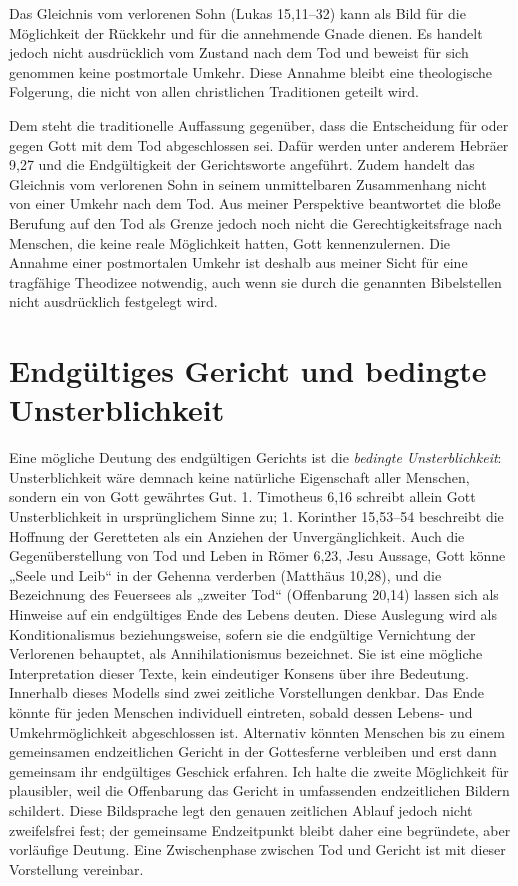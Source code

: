 Das Gleichnis vom verlorenen Sohn (Lukas 15,11--32) kann als Bild für die Möglichkeit der Rückkehr und für die annehmende Gnade dienen. Es handelt jedoch nicht ausdrücklich vom Zustand nach dem Tod und beweist für sich genommen keine postmortale Umkehr. Diese Annahme bleibt eine theologische Folgerung, die nicht von allen christlichen Traditionen geteilt wird.

Dem steht die traditionelle Auffassung gegenüber, dass die Entscheidung für oder gegen Gott mit dem Tod abgeschlossen sei. Dafür werden unter anderem Hebräer 9,27 und die Endgültigkeit der Gerichtsworte angeführt. Zudem handelt das Gleichnis vom verlorenen Sohn in seinem unmittelbaren Zusammenhang nicht von einer Umkehr nach dem Tod. Aus meiner Perspektive beantwortet die bloße Berufung auf den Tod als Grenze jedoch noch nicht die Gerechtigkeitsfrage nach Menschen, die keine reale Möglichkeit hatten, Gott kennenzulernen. Die Annahme einer postmortalen Umkehr ist deshalb aus meiner Sicht für eine tragfähige Theodizee notwendig, auch wenn sie durch die genannten Bibelstellen nicht ausdrücklich festgelegt wird.

\section{Endgültiges Gericht und bedingte Unsterblichkeit}

Eine mögliche Deutung des endgültigen Gerichts ist die \emph{bedingte Unsterblichkeit}: Unsterblichkeit wäre demnach keine natürliche Eigenschaft aller Menschen, sondern ein von Gott gewährtes Gut. 1. Timotheus 6,16 schreibt allein Gott Unsterblichkeit in ursprünglichem Sinne zu; 1. Korinther 15,53--54 beschreibt die Hoffnung der Geretteten als ein Anziehen der Unvergänglichkeit. Auch die Gegenüberstellung von Tod und Leben in Römer 6,23, Jesu Aussage, Gott könne „Seele und Leib“ in der Gehenna verderben (Matthäus 10,28), und die Bezeichnung des Feuersees als „zweiter Tod“ (Offenbarung 20,14) lassen sich als Hinweise auf ein endgültiges Ende des Lebens deuten. Diese Auslegung wird als Konditionalismus beziehungsweise, sofern sie die endgültige Vernichtung der Verlorenen behauptet, als Annihilationismus bezeichnet. Sie ist eine mögliche Interpretation dieser Texte, kein eindeutiger Konsens über ihre Bedeutung.
\\

Innerhalb dieses Modells sind zwei zeitliche Vorstellungen denkbar. Das Ende könnte für jeden Menschen individuell eintreten, sobald dessen Lebens- und Umkehrmöglichkeit abgeschlossen ist. Alternativ könnten Menschen bis zu einem gemeinsamen endzeitlichen Gericht in der Gottesferne verbleiben und erst dann gemeinsam ihr endgültiges Geschick erfahren. Ich halte die zweite Möglichkeit für plausibler, weil die Offenbarung das Gericht in umfassenden endzeitlichen Bildern schildert. Diese Bildsprache legt den genauen zeitlichen Ablauf jedoch nicht zweifelsfrei fest; der gemeinsame Endzeitpunkt bleibt daher eine begründete, aber vorläufige Deutung. Eine Zwischenphase zwischen Tod und Gericht ist mit dieser Vorstellung vereinbar.
\\

